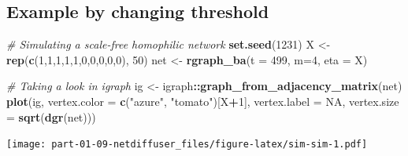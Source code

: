\documentclass[
]{book}
\newenvironment{Shaded}{\begin{snugshade}}{\end{snugshade}}
\newcommand{\AttributeTok}[1]{\textcolor[rgb]{0.13,0.29,0.53}{#1}}
\newcommand{\CommentTok}[1]{\textcolor[rgb]{0.56,0.35,0.01}{\textit{#1}}}
\newcommand{\ConstantTok}[1]{\textcolor[rgb]{0.56,0.35,0.01}{#1}}
\newcommand{\DecValTok}[1]{\textcolor[rgb]{0.00,0.00,0.81}{#1}}
\newcommand{\FunctionTok}[1]{\textcolor[rgb]{0.13,0.29,0.53}{\textbf{#1}}}
\newcommand{\NormalTok}[1]{#1}
\newcommand{\OtherTok}[1]{\textcolor[rgb]{0.56,0.35,0.01}{#1}}
\newcommand{\SpecialCharTok}[1]{\textcolor[rgb]{0.81,0.36,0.00}{\textbf{#1}}}
\newcommand{\StringTok}[1]{\textcolor[rgb]{0.31,0.60,0.02}{#1}}
\begin{document}
\hypertarget{example-by-changing-threshold}{%
\subsection{Example by changing threshold}\label{example-by-changing-threshold}}

\begin{Shaded}
\begin{Highlighting}[]

\CommentTok{\# Simulating a scale{-}free homophilic network}
\FunctionTok{set.seed}\NormalTok{(}\DecValTok{1231}\NormalTok{)}
\NormalTok{X }\OtherTok{\textless{}{-}} \FunctionTok{rep}\NormalTok{(}\FunctionTok{c}\NormalTok{(}\DecValTok{1}\NormalTok{,}\DecValTok{1}\NormalTok{,}\DecValTok{1}\NormalTok{,}\DecValTok{1}\NormalTok{,}\DecValTok{1}\NormalTok{,}\DecValTok{0}\NormalTok{,}\DecValTok{0}\NormalTok{,}\DecValTok{0}\NormalTok{,}\DecValTok{0}\NormalTok{,}\DecValTok{0}\NormalTok{), }\DecValTok{50}\NormalTok{)}
\NormalTok{net }\OtherTok{\textless{}{-}} \FunctionTok{rgraph\_ba}\NormalTok{(}\AttributeTok{t =} \DecValTok{499}\NormalTok{, }\AttributeTok{m=}\DecValTok{4}\NormalTok{, }\AttributeTok{eta =}\NormalTok{ X)}

\CommentTok{\# Taking a look in igraph}
\NormalTok{ig  }\OtherTok{\textless{}{-}}\NormalTok{ igraph}\SpecialCharTok{::}\FunctionTok{graph\_from\_adjacency\_matrix}\NormalTok{(net)}
\FunctionTok{plot}\NormalTok{(ig, }\AttributeTok{vertex.color =} \FunctionTok{c}\NormalTok{(}\StringTok{"azure"}\NormalTok{, }\StringTok{"tomato"}\NormalTok{)[X}\SpecialCharTok{+}\DecValTok{1}\NormalTok{], }\AttributeTok{vertex.label =} \ConstantTok{NA}\NormalTok{,}
     \AttributeTok{vertex.size =} \FunctionTok{sqrt}\NormalTok{(}\FunctionTok{dgr}\NormalTok{(net)))}
\end{Highlighting}
\end{Shaded}

\texttt{[image: part-01-09-netdiffuser\_files/figure-latex/sim-sim-1.pdf]}
\end{document}
